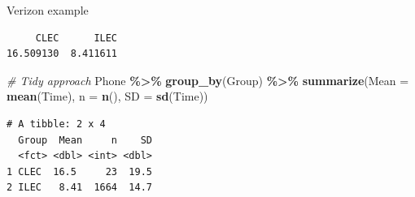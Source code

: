 \documentclass[
  ignorenonframetext,
]{beamer}
\newenvironment{Shaded}{\begin{snugshade}}{\end{snugshade}}
\newcommand{\AttributeTok}[1]{\textcolor[rgb]{0.13,0.29,0.53}{#1}}
\newcommand{\CommentTok}[1]{\textcolor[rgb]{0.56,0.35,0.01}{\textit{#1}}}
\newcommand{\FunctionTok}[1]{\textcolor[rgb]{0.13,0.29,0.53}{\textbf{#1}}}
\newcommand{\NormalTok}[1]{#1}
\newcommand{\OtherTok}[1]{\textcolor[rgb]{0.56,0.35,0.01}{#1}}
\newcommand{\SpecialCharTok}[1]{\textcolor[rgb]{0.81,0.36,0.00}{\textbf{#1}}}
\begin{document}
\begin{frame}[fragile]{Verizon example}
\label{verizon-example-1}
\normalsize

\begin{Shaded}
\end{Shaded}

\begin{verbatim}
     CLEC      ILEC 
16.509130  8.411611 
\end{verbatim}

\begin{Shaded}
\begin{Highlighting}[]
\CommentTok{\# Tidy approach}
\NormalTok{Phone }\SpecialCharTok{\%\textgreater{}\%} 
  \FunctionTok{group\_by}\NormalTok{(Group) }\SpecialCharTok{\%\textgreater{}\%} 
  \FunctionTok{summarize}\NormalTok{(}\AttributeTok{Mean =} \FunctionTok{mean}\NormalTok{(Time), }\AttributeTok{n =} \FunctionTok{n}\NormalTok{(), }\AttributeTok{SD =} \FunctionTok{sd}\NormalTok{(Time))}
\end{Highlighting}
\end{Shaded}

\begin{verbatim}
# A tibble: 2 x 4
  Group  Mean     n    SD
  <fct> <dbl> <int> <dbl>
1 CLEC  16.5     23  19.5
2 ILEC   8.41  1664  14.7
\end{verbatim}

\normalsize
\end{frame}
\end{document}
